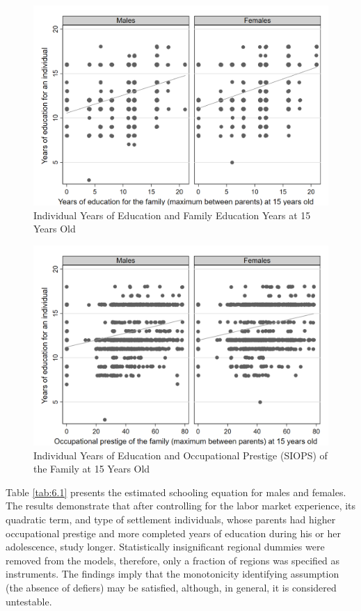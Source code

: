 \documentclass[alpha-refs]{wiley-article-01g}
\begin{document}
\begin{figure}[h!]
	\centering
	\includegraphics[width=\textwidth]{fam_edu_schooling.png}
	\caption{Individual Years of Education and Family Education Years at 15 Years Old}\label{fig:6.1}
\end{figure}

\begin{figure}[h!]
	\centering
	\includegraphics[width=\textwidth]{fam_prestige_schooling.png}
	\caption{Individual Years of Education and Occupational Prestige (SIOPS) of the Family at 15 Years Old}\label{fig:6.2}
\end{figure}

Table \ref{tab:6.1} presents the estimated schooling equation for males and females. The results demonstrate that after controlling for the labor market experience, its quadratic term, and type of settlement individuals, whose parents had higher occupational prestige and more completed years of education during his or her adolescence, study longer. Statistically insignificant regional dummies were removed from the models, therefore, only a fraction of regions was specified as instruments. The findings imply that the monotonicity identifying assumption (the absence of defiers) may be satisfied, although, in general, it is considered untestable.
\end{document}

